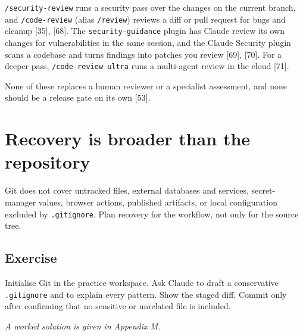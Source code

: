 \documentclass[11pt,a4paper,twoside,openany]{book}
\begin{document}
\texttt{/\allowbreak{}security-\allowbreak{}review} runs a security pass over the changes on the current branch, and \texttt{/\allowbreak{}code-\allowbreak{}review} (alias \texttt{/\allowbreak{}review}) reviews a diff or pull request for bugs and cleanup [35], [68]. The \texttt{security-\allowbreak{}guidance} plugin has Claude review its own changes for vulnerabilities in the same session, and the Claude Security plugin scans a codebase and turns findings into patches you review [69], [70]. For a deeper pass, \texttt{/\allowbreak{}code-\allowbreak{}review ultr\allowbreak{}a} runs a multi-agent review in the cloud [71].


None of these replaces a human reviewer or a specialist assessment, and none should be a release gate on its own [53].


\FloatBarrier
\setcounter{section}{4}
\section{Recovery is broader than the repository}

Git does not cover untracked files, external databases and services, secret-manager values, browser actions, published artifacts, or local configuration excluded by \texttt{.\allowbreak{}gitignore}. Plan recovery for the workflow, not only for the source tree.


\subsection*{Exercise}

Initialise Git in the practice workspace. Ask Claude to draft a conservative \texttt{.\allowbreak{}gitignore} and to explain every pattern. Show the staged diff. Commit only after confirming that no sensitive or unrelated file is included.


\emph{A worked solution is given in Appendix M.}
\end{document}
